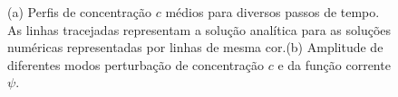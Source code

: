 \documentclass[a4paper,portuges,12pt]{article}
\begin{document}
 \begin{figure}[h!]
 	\begin{center}
 		\hspace{0.7cm}
 	\end{center}
	\caption{(a) Perfis de concentração $c$ médios para diversos passos
	de tempo. As linhas tracejadas representam a solução analítica para
	as soluções numéricas representadas por linhas de mesma cor.(b)
	Amplitude de diferentes modos perturbação de concentração $c$ e da
	função corrente $\psi$.} 
	\label{fig:chem1} 
 \end{figure}
\end{document}
